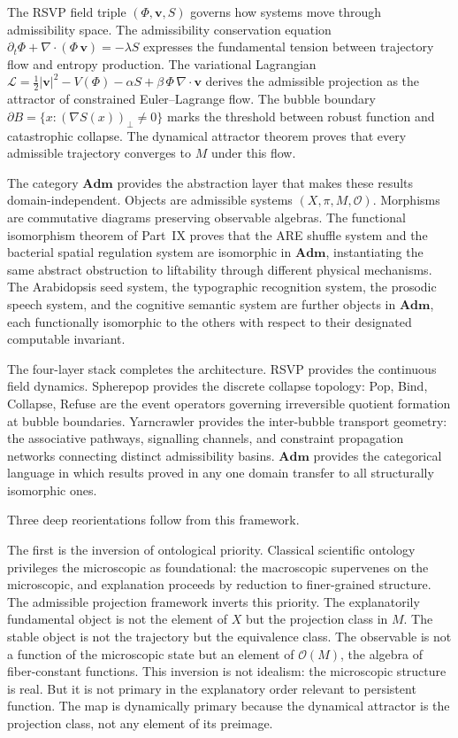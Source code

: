 \documentclass[12pt, a4paper]{article}
\theoremstyle{essaystyle}
\begin{document}
The RSVP field triple $(\Phi, \mathbf{v}, S)$ governs how systems move through
admissibility space. The admissibility conservation equation
$\partial_t \Phi + \nabla \cdot (\Phi\,\mathbf{v}) = -\lambda S$ expresses the
fundamental tension between trajectory flow and entropy production. The variational
Lagrangian $\mathcal{L} = \tfrac{1}{2}|\mathbf{v}|^2 - V(\Phi) - \alpha S +
\beta\,\Phi\,\nabla\cdot\mathbf{v}$ derives the admissible projection as the attractor
of constrained Euler--Lagrange flow. The bubble boundary $\partial B = \{x :
(\nabla S(x))_\perp \neq 0\}$ marks the threshold between robust function and
catastrophic collapse. The dynamical attractor theorem proves that every admissible
trajectory converges to $M$ under this flow.

The category $\mathbf{Adm}$ provides the abstraction layer that makes these results
domain-independent. Objects are admissible systems $(X, \pi, M, \mathcal{O})$.
Morphisms are commutative diagrams preserving observable algebras. The functional
isomorphism theorem of Part~IX proves that the ARE shuffle system and the bacterial
spatial regulation system are isomorphic in $\mathbf{Adm}$, instantiating the same
abstract obstruction to liftability through different physical mechanisms. The
Arabidopsis seed system, the typographic recognition system, the prosodic speech
system, and the cognitive semantic system are further objects in $\mathbf{Adm}$,
each functionally isomorphic to the others with respect to their designated
computable invariant.

The four-layer stack completes the architecture. RSVP provides the continuous field
dynamics. Spherepop provides the discrete collapse topology: Pop, Bind, Collapse,
Refuse are the event operators governing irreversible quotient formation at bubble
boundaries. Yarncrawler provides the inter-bubble transport geometry: the associative
pathways, signalling channels, and constraint propagation networks connecting distinct
admissibility basins. $\mathbf{Adm}$ provides the categorical language in which
results proved in any one domain transfer to all structurally isomorphic ones.

Three deep reorientations follow from this framework.

The first is the inversion of ontological priority. Classical scientific ontology
privileges the microscopic as foundational: the macroscopic supervenes on the
microscopic, and explanation proceeds by reduction to finer-grained structure.
The admissible projection framework inverts this priority. The explanatorily
fundamental object is not the element of $X$ but the projection class in $M$.
The stable object is not the trajectory but the equivalence class. The observable
is not a function of the microscopic state but an element of $\mathcal{O}(M)$,
the algebra of fiber-constant functions. This inversion is not idealism: the
microscopic structure is real. But it is not primary in the explanatory order
relevant to persistent function. The map is dynamically primary because the
dynamical attractor is the projection class, not any element of its preimage.
\end{document}
